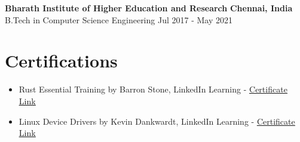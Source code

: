 \documentclass[10pt, letterpad, sans]{extarticle}
\newcommand{\edusection}[5] {
	\raggedright\normalsize{\textbf{#1}
	\hfill {\small \textbf{#2}} } \\
	{#4}
	\hfill {\small {#3}} \\
	{\small #5} }
\begin{document}
\edusection
{Bharath Institute of Higher Education and Research}
{Chennai, India}
{Jul 2017 {-} May 2021}
{B.Tech in Computer Science Engineering}
{}

\section{Certifications}
\begin{itemize}[leftmargin=6mm]
	\item{Rust Essential Training by Barron Stone, LinkedIn Learning} - \href{https://www.linkedin.com/learning/certificates/5b0eb9a5191ed3a4cb605f7b8b9e5864ed123e5b13b5f8f68bfc99b6ff8cd87d?trk=share_certificate}{\underline {Certificate Link}}
	\item{Linux Device Drivers by Kevin Dankwardt, LinkedIn Learning} - \href{https://www.linkedin.com/learning/certificates/ef2284b25b44e40cdb305a085b6a77f7a4f0eac3762a844f5530279dd01a9549?trk=share_certificate}{\underline {Certificate Link}}
\end{itemize}
\end{document}
